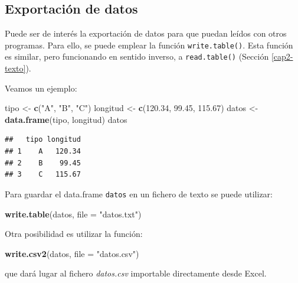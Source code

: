\documentclass[
]{book}
\newenvironment{Shaded}{\begin{snugshade}}{\end{snugshade}}
\newcommand{\DataTypeTok}[1]{\textcolor[rgb]{0.13,0.29,0.53}{#1}}
\newcommand{\FloatTok}[1]{\textcolor[rgb]{0.00,0.00,0.81}{#1}}
\newcommand{\KeywordTok}[1]{\textcolor[rgb]{0.13,0.29,0.53}{\textbf{#1}}}
\newcommand{\NormalTok}[1]{#1}
\newcommand{\StringTok}[1]{\textcolor[rgb]{0.31,0.60,0.02}{#1}}
\begin{document}
\hypertarget{exportaciuxf3n-de-datos}{%
\subsection{Exportación de datos}\label{exportaciuxf3n-de-datos}}

Puede ser de interés la
exportación de datos para que puedan leídos con otros programas. Para
ello, se puede emplear la función \texttt{write.table()}. Esta función es
similar, pero funcionando en sentido inverso, a \texttt{read.table()}
(Sección \ref{cap2-texto}).

Veamos un ejemplo:

\begin{Shaded}
\begin{Highlighting}[]
\NormalTok{tipo <-}\StringTok{ }\KeywordTok{c}\NormalTok{(}\StringTok{"A"}\NormalTok{, }\StringTok{"B"}\NormalTok{, }\StringTok{"C"}\NormalTok{)}
\NormalTok{longitud <-}\StringTok{ }\KeywordTok{c}\NormalTok{(}\FloatTok{120.34}\NormalTok{, }\FloatTok{99.45}\NormalTok{, }\FloatTok{115.67}\NormalTok{)}
\NormalTok{datos <-}\StringTok{ }\KeywordTok{data.frame}\NormalTok{(tipo, longitud)}
\NormalTok{datos}
\end{Highlighting}
\end{Shaded}

\begin{verbatim}
##   tipo longitud
## 1    A   120.34
## 2    B    99.45
## 3    C   115.67
\end{verbatim}

Para guardar el data.frame \texttt{datos} en un fichero de texto se
puede utilizar:

\begin{Shaded}
\begin{Highlighting}[]
\KeywordTok{write.table}\NormalTok{(datos, }\DataTypeTok{file =} \StringTok{"datos.txt"}\NormalTok{)}
\end{Highlighting}
\end{Shaded}

Otra posibilidad es utilizar la función:

\begin{Shaded}
\begin{Highlighting}[]
\KeywordTok{write.csv2}\NormalTok{(datos, }\DataTypeTok{file =} \StringTok{"datos.csv"}\NormalTok{)}
\end{Highlighting}
\end{Shaded}

que dará lugar al fichero \emph{datos.csv} importable directamente desde Excel.
\end{document}
